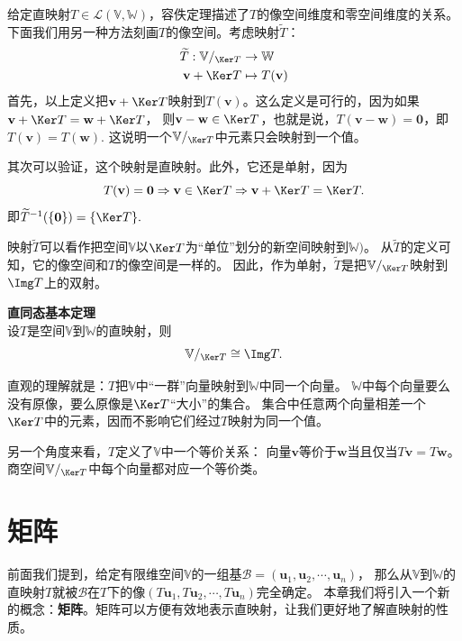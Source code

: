 \documentclass[12pt,UTF8]{ctexbook}
\begin{document}
给定直映射$T \in \mathcal{L}(\mathbb{V}, \mathbb{W})$，容佚定理描述了$T$的像空间维度和零空间维度的关系。
下面我们用另一种方法刻画$T$的像空间。考虑映射$\widetilde{T}$：
\begin{align*} 
    \widetilde{T} : \mathbb{V}/_{\Ker T} &\rightarrow \mathbb{W}  \\
    \mathbf{v} + \Ker T &\mapsto T(\mathbf{v}) 
\end{align*}
首先，以上定义把$\mathbf{v} + \Ker T$映射到$T(\mathbf{v})$。这么定义是可行的，因为如果$\mathbf{v} + \Ker T = \mathbf{w} + \Ker T$，
则$\mathbf{v} - \mathbf{w} \in \Ker T$，也就是说，$T(\mathbf{v} - \mathbf{w}) = \mathbf{0}$，即$T(\mathbf{v}) =T(\mathbf{w})$. 
这说明一个$\mathbb{V}/_{\Ker T}$中元素只会映射到一个值。

其次可以验证，这个映射是直映射。此外，它还是单射，因为
$$ T(\mathbf{v}) = \mathbf{0} \Rightarrow \mathbf{v} \in \Ker T \Rightarrow \mathbf{v} + \Ker T = \Ker T. $$
即$\widetilde{T}^{-1}(\{\mathbf{0}\}) = \{\Ker T\}.$

映射$\widetilde{T}$可以看作把空间$\mathbb{V}$以$\Ker T$为“单位”划分的新空间映射到$\mathbb{W})$。
从$\widetilde{T}$的定义可知，它的像空间和$T$的像空间是一样的。
因此，作为单射，$\widetilde{T}$是把$\mathbb{V}/_{\Ker T}$映射到$\Img T$上的双射。
\begin{pp}{\bfseries 直同态基本定理 }\label{pp:3_11}\\
    设$T$是空间$\mathbb{V}$到$\mathbb{W}$的直映射，则
    $$\mathbb{V}/_{\Ker T} \cong \Img T.$$
\end{pp}

直观的理解就是：$T$把$\mathbb{V}$中“一群”向量映射到$\mathbb{W}$中同一个向量。
$\mathbb{W}$中每个向量要么没有原像，要么原像是$\Ker T$“大小”的集合。
集合中任意两个向量相差一个$\Ker T$中的元素，因而不影响它们经过$T$映射为同一个值。

另一个角度来看，$T$定义了$\mathbb{V}$中一个等价关系：
向量$\mathbf{v}$等价于$\mathbf{w}$当且仅当$T\mathbf{v} = T\mathbf{w}$。
商空间$\mathbb{V}/_{\Ker T}$中每个向量都对应一个等价类。

\chapter{矩阵}

前面我们提到，给定有限维空间$\mathbb{V}$的一组基$\mathcal{B} = (\mathbf{u}_1, \mathbf{u}_2, \cdots, \mathbf{u}_n)$，
那么从$\mathbb{V}$到$\mathbb{W}$的直映射$T$就被$\mathcal{B}$在$T$下的像$(T\mathbf{u}_1, T\mathbf{u}_2, \cdots, T\mathbf{u}_n)$完全确定。
本章我们将引入一个新的概念：\textbf{矩阵}。矩阵可以方便有效地表示直映射，让我们更好地了解直映射的性质。
\end{document}
